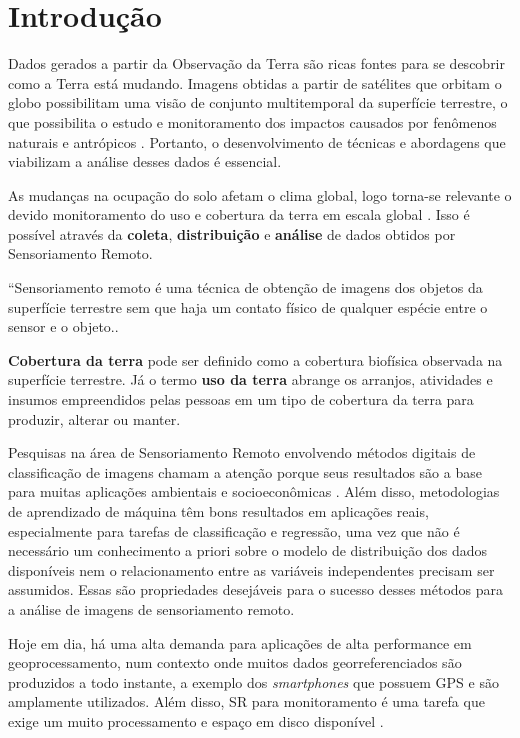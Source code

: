 \chapter{Introdução}\label{introducao}

Dados gerados a partir da Observação da Terra são ricas fontes para se
descobrir como a Terra está mudando. Imagens obtidas a partir de
satélites que orbitam o globo possibilitam uma visão de conjunto
multitemporal da superfície terrestre, o que possibilita o estudo e
monitoramento dos impactos causados por fenômenos naturais e antrópicos \cite{florenzano2002imagens}. Portanto, o desenvolvimento de técnicas e abordagens que viabilizam a análise desses dados é essencial.

As mudanças na ocupação do solo afetam o clima global, logo torna-se
relevante o devido monitoramento do uso e cobertura da terra em escala
global \cite{wulder2014satellites}. Isso é possível através da \textbf{coleta}, \textbf{distribuição} e \textbf{análise} de dados obtidos por Sensoriamento Remoto.

\begin{citacao}
``Sensoriamento remoto é uma técnica de obtenção de imagens dos objetos
da superfície terrestre sem que haja um contato físico de qualquer
espécie entre o sensor e o objeto.\cite[p. 3]{meneses2012introduccao}.
\end{citacao}

\textbf{Cobertura da terra} pode ser definido como a cobertura biofísica observada na superfície terrestre. Já o termo \textbf{uso da terra} abrange os arranjos, atividades e insumos empreendidos pelas pessoas em um tipo de cobertura da terra para produzir, alterar ou manter. \cite{di2016land} 
 
Pesquisas na área de Sensoriamento Remoto envolvendo métodos digitais de classificação de imagens chamam a atenção porque seus resultados são a base para
muitas aplicações ambientais e socioeconômicas \cite{lu-weng}. Além
disso, metodologias de aprendizado de máquina têm bons resultados em
aplicações reais, especialmente para tarefas de classificação e
regressão, uma vez que não é necessário um conhecimento a priori sobre o modelo de distribuição dos dados disponíveis nem o relacionamento entre as variáveis independentes precisam ser assumidos. Essas são
propriedades desejáveis para o sucesso desses métodos para a análise de
imagens de sensoriamento remoto. \cite{waske2009machine}

Hoje em dia, há uma alta demanda para aplicações de alta performance
em geoprocessamento, num contexto onde muitos dados georreferenciados
são produzidos a todo instante, a exemplo dos \emph{smartphones} que
possuem GPS e são amplamente utilizados. Além disso, SR para
monitoramento é uma tarefa que exige um muito processamento e espaço em
disco disponível \cite{geocompr}.

